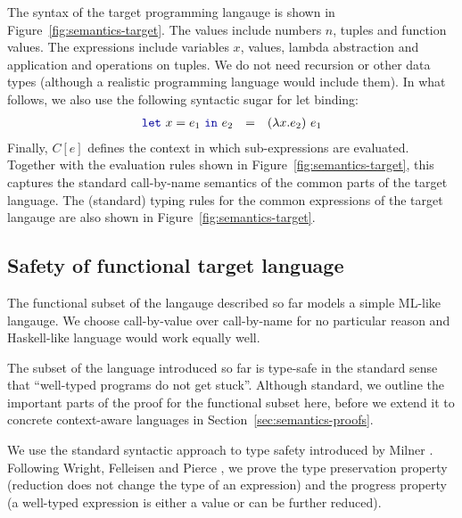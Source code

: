The syntax of the target programming langauge is shown in Figure~\ref{fig:semantics-target}. 
The values include numbers $n$, tuples and function values. The expressions include variables $x$, 
values, lambda abstraction and application and operations on tuples. We do not need recursion or 
other data types (although a realistic programming language would include them). 
In what follows, we also use the following syntactic sugar for let binding:
%
\begin{equation*}
\begin{array}{rcl}
  \kvd{let}~x=e_1~\kvd{in}~e_2 &=& (\lambda x.e_2)~e_1
\end{array}
\end{equation*}
%
Finally, $C[e]$ defines the context in which sub-expressions are evaluated. Together with the
evaluation rules shown in  Figure~\ref{fig:semantics-target}, this captures the standard 
call-by-name semantics of the common parts of the target language. The (standard) typing rules 
for the common expressions of the target langauge are also shown in Figure~\ref{fig:semantics-target}.


\subsection{Safety of functional target language}

The functional subset of the langauge described so far models a simple ML-like langauge. We 
choose call-by-value over call-by-name for no particular reason and Haskell-like language would
work equally well.

The subset of the language introduced so far is type-safe in the standard sense that
``well-typed programs do not get stuck''. Although standard, we outline the important parts
of the proof for the functional subset here, before we extend it to concrete context-aware
languages in Section~\ref{sec:semantics-proofs}.

We use the standard syntactic approach to type safety introduced by Milner \cite{syntactic-sml}.
Following Wright, Felleisen and Pierce \cite{syntactic-tapl,syntactic-approach}, we prove the
type preservation property (reduction does not change the type of an expression) and the progress 
property (a well-typed expression is either a value or can be further reduced).

